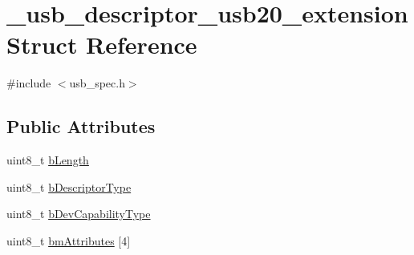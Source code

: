 \hypertarget{struct__usb__descriptor__usb20__extension}{\section{\-\_\-usb\-\_\-descriptor\-\_\-usb20\-\_\-extension Struct Reference}
\label{struct__usb__descriptor__usb20__extension}
}


{\ttfamily \#include $<$usb\-\_\-spec.\-h$>$}

\subsection*{Public Attributes}
\begin{DoxyCompactItemize}
\item 
uint8\-\_\-t \hyperlink{struct__usb__descriptor__usb20__extension_a19dabf4bce2e48c28ad154710e6883cf}{b\-Length}
\item 
uint8\-\_\-t \hyperlink{struct__usb__descriptor__usb20__extension_a1f19d1d6296755b04b238d7d00d1ba5e}{b\-Descriptor\-Type}
\item 
uint8\-\_\-t \hyperlink{struct__usb__descriptor__usb20__extension_a7763483aaf68ac9a250f50e457206390}{b\-Dev\-Capability\-Type}
\item 
uint8\-\_\-t \hyperlink{struct__usb__descriptor__usb20__extension_a93cbe8f7fb11eec7f4e869857f0152a2}{bm\-Attributes} \mbox{[}4\mbox{]}
\end{DoxyCompactItemize}


